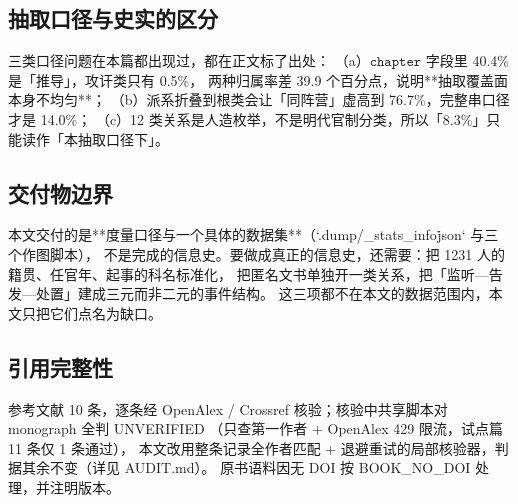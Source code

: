 \subsection{抽取口径与史实的区分}

三类口径问题在本篇都出现过，都在正文标了出处：
（a）$\texttt{chapter}$ 字段里 40.4\% 是「推导」，攻讦类只有 0.5\%，
两种归属率差 39.9 个百分点，说明**抽取覆盖面本身不均匀**；
（b）派系折叠到根类会让「同阵营」虚高到 76.7\%，完整串口径才是 14.0\%；
（c）12 类关系是人造枚举，不是明代官制分类，所以「8.3\%」只能读作「本抽取口径下」。

\subsection{交付物边界}

本文交付的是**度量口径与一个具体的数据集**（`.dump/\_stats\_info\.json` 与三个作图脚本），
不是完成的信息史。要做成真正的信息史，还需要：把 1231 人的籍贯、任官年、起事的科名标准化，
把匿名文书单独开一类关系，把「监听—告发—处置」建成三元而非二元的事件结构。
这三项都不在本文的数据范围内，本文只把它们点名为缺口。

\subsection{引用完整性}

参考文献 10 条，逐条经 OpenAlex / Crossref 核验；核验中共享脚本对 monograph 全判 UNVERIFIED
（只查第一作者 + OpenAlex 429 限流，试点篇 11 条仅 1 条通过），
本文改用整条记录全作者匹配 + 退避重试的局部核验器，判据其余不变（详见 AUDIT.md）。
原书语料因无 DOI 按 BOOK\_NO\_DOI 处理，并注明版本。
